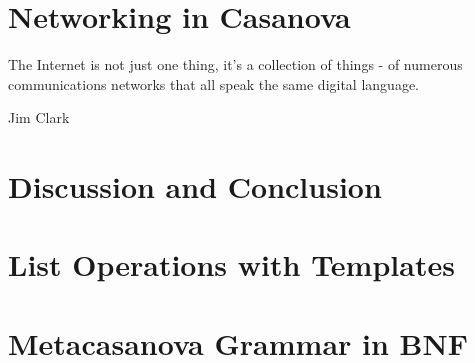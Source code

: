 \documentclass[9pt,a5paper,openright]{extbook}
\theoremstyle{definition}
\begin{document}
\chapter{Networking in Casanova}
\label{ch:networking}
\epigraph{The Internet is not just one thing, it's a collection of things - of numerous communications networks that all speak the same digital language.}{Jim Clark}


\chapter{Discussion and Conclusion}
\label{ch:discussion}


\appendix
\chapter{List Operations with Templates}
\label{app:template}


\chapter{Metacasanova Grammar in BNF}
\label{app:metacasanova_grammar}


\backmatter



\end{document}
